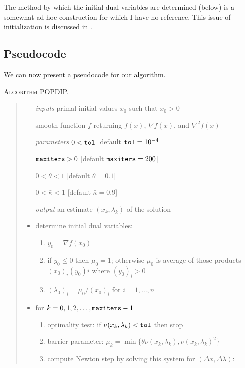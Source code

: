 \documentclass[11pt]{article}
\newcommand{\grad}{\nabla}
\begin{document}
The method by which the initial dual variables are determined (below) is a somewhat ad hoc construction for which I have no reference.  This issue of initialization is discussed in \cite{Gertzetal2004}.


\subsection*{Pseudocode}

We can now present a pseudocode for our algorithm.

\bigskip
\noindent \textsc{Algorithm POPDIP.}
\begin{quote}
\begin{itemize}
\item[\emph{inputs}]  primal initial values $x_0$ such that $x_0 > 0$
\item[]  smooth function $f$ returning $f(x)$, $\grad f(x)$, and $\grad^2 f(x)$
\item[\emph{parameters}]  $0<\text{\texttt{tol}}$ [default $\text{\texttt{tol}}=10^{-4}$]
\item[]  $\text{\texttt{maxiters}}>0$ [default $\text{\texttt{maxiters}}=200$]
\item[]  $0<\theta<1$ [default $\theta=0.1$]
\item[]  $0<\bar\kappa<1$ [default $\bar\kappa=0.9$]
\item[\emph{output}]  an estimate $(x_k,\lambda_k)$ of the solution
\item  determine initial dual variables:
    \renewcommand{\labelenumi}{(\roman{enumi})}
    \begin{enumerate}
    \item $y_0 = \grad f(x_0)$
    \item if $y_0 \le 0$ then $\mu_0=1$; otherwise $\mu_0$ is average of those products $(x_0)_i (y_0)i$ where $(y_0)_i > 0$
    \item $(\lambda_0)_i = \mu_0 / (x_0)_i$ for $i=1,\dots,n$
    \end{enumerate}
\item  for $k=0,1,2,\dots,\text{\texttt{maxiters}}-1$
    \renewcommand{\labelenumi}{(\roman{enumi})}
    \begin{enumerate}
    \item optimality test: if $\nu(x_k,\lambda_k)<\text{\texttt{tol}}$ then stop
    \item barrier parameter: $\mu_k = \min\{\theta \nu(x_k,\lambda_k),\nu(x_k,\lambda_k)^2\}$
    \item compute Newton step by solving this system for $(\Delta x,\Delta \lambda)$:

\end{enumerate}
\end{itemize}
\end{quote}
\end{document}

